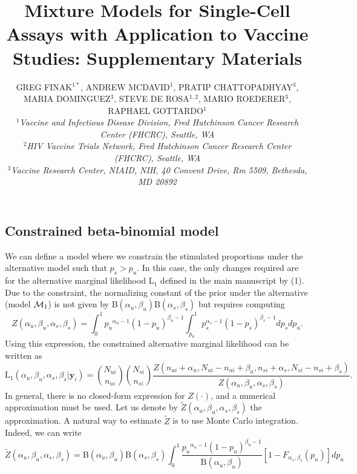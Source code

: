 \documentclass{article}
\title{Mixture Models for Single-Cell Assays with Application to Vaccine Studies: Supplementary Materials}
\author{GREG FINAK$^{1\ast}$, 
 ANDREW MCDAVID$^{1}$,
 PRATIP CHATTOPADHYAY$^{3}$,
 MARIA DOMINGUEZ$^{3}$,
 STEVE DE ROSA$^{1,2}$,
 MARIO ROEDERER$^{3}$, 
 RAPHAEL GOTTARDO$^{1}$\\
\textit{ $^{1}$Vaccine and Infectious Disease Division, Fred Hutchinson Cancer Research Center (FHCRC), Seattle, WA\\
 $^{2}$HIV Vaccine Trials Network, Fred Hutchinson Cancer Research Center (FHCRC), Seattle, WA\\
 $^{3}$Vaccine Research Center, NIAID, NIH, 40 Convent Drive, Rm 5509, Bethesda, MD 20892}}
\date{}
\begin{document}
\maketitle
\appendix
\renewcommand{\thesubsection}{Appendix \Alph{subsection}:}
\setcounter{subsection}{0}
\renewcommand{\figurename}{\textbf{Supplementary Figure}}
\renewcommand{\thefigure}{\textbf{\arabic{figure}}}
\setcounter{figure}{0}

\section*{}

\subsection{Constrained beta-binomial model}
\label{supp:constrained}
We can define a model where we constrain the stimulated proportions under the alternative model such that $p_s>p_u$. In this case, the only changes required are for the alternative marginal likelihood $\mathrm{L}_1$ defined in the main manuscript by (1). Due to the constraint, the normalizing constant of the prior under the alternative (model ${\cal M}_1$) is not given by $\mathrm{B}(\alpha_u,\beta_u)\mathrm{B}(\alpha_s,\beta_s)$ but requires computing \[
Z(\alpha_u, \beta_u, \alpha_s, \beta_s)=\int_{0}^1{p_u}^{\alpha_u-1}(1-p_u)^{\beta_u-1}\int_{p_u}^1 p_s^{\alpha_s-1}(1-p_s)^{\beta_s-1}dp_sdp_u.
\]
Using this expression, the constrained alternative marginal likelihood can be written as
\[
\mathrm{L}_1(\alpha_u,\beta_u,\alpha_s,\beta_s|\mathbf{y}_i)
=\binom{N_{ui}}{n_{ui}} \binom{N_{si}}{n_{si}}\frac{Z(n_{ui}+\alpha_u,N_{ui}-n_{ui}+\beta_u,n_{si}+\alpha_s,N_{si}-n_{si}+\beta_s)}{Z(\alpha_u,\beta_u,\alpha_s,\beta_s)}.
\label{model2:constrained}
\]
In general, there is no closed-form expression for $Z(\cdot)$, and a numerical approximation must be used. Let us denote by $\tilde{Z}(\alpha_u, \beta_u, \alpha_s, \beta_s)$ the approximation. A natural way to estimate $\tilde{Z}$ is to use Monte Carlo integration. Indeed, we can write
\begin{equation}
\tilde{Z}(\alpha_u, \beta_u, \alpha_s, \beta_s)=\mathrm{B}(\alpha_u,\beta_u)\mathrm{B}(\alpha_s,\beta_s)\int_{0}^1\frac{{p_u}^{\alpha_u-1}(1-p_u)^{\beta_u-1}}{\mathrm{B}(\alpha_u,\beta_u)}[1-F_{\alpha_s,\beta_s}(p_u)]dp_u
\label{equ:normZ}
\end{equation}
\end{document}
